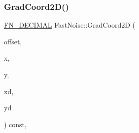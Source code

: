 \subsubsection{\texorpdfstring{Grad\+Coord2\+D()}{GradCoord2D()}}
{\footnotesize\ttfamily \mbox{\hyperlink{_fast_noise_8h_a75a9ef6d2541c4921815b885bfd449c3}{F\+N\+\_\+\+D\+E\+C\+I\+M\+AL}} Fast\+Noise\+::\+Grad\+Coord2D (\begin{DoxyParamCaption}\item[{unsigned char}]{offset,  }\item[{int}]{x,  }\item[{int}]{y,  }\item[{\mbox{\hyperlink{_fast_noise_8h_a75a9ef6d2541c4921815b885bfd449c3}{F\+N\+\_\+\+D\+E\+C\+I\+M\+AL}}}]{xd,  }\item[{\mbox{\hyperlink{_fast_noise_8h_a75a9ef6d2541c4921815b885bfd449c3}{F\+N\+\_\+\+D\+E\+C\+I\+M\+AL}}}]{yd }\end{DoxyParamCaption}) const\hspace{0.3cm}{\ttfamily [inline]}, {\ttfamily [private]}}

